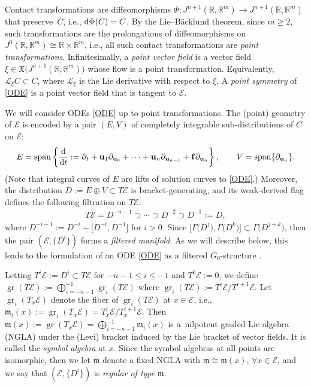 \documentclass[pdftex]{sigma}%
\DeclareMathOperator{\gr}{gr}
\DeclareMathOperator{\sn}{span}
\newcommand\cL{\mathcal{L}}
\renewcommand\gr{\operatorname{gr}}
\newcommand\fm {\mathfrak{m}}
\newcommand{\R}{\mathbb{R}}
\newcommand\cE{\mathcal{E}}
\numberwithin{equation}{section}
\begin{document}
 Contact transformations are diffeomorphisms $\Phi\colon J^{n+1}(\R, \R^m) \to J^{n+1}(\R, \R^m)$ that preserve~$C$, i.e., ${\rm d}\Phi(C) = C$. By the Lie--B\"{a}cklund theorem, since $m \ge 2$, such transformations are the prolongations of diffeomorphisms on $J^0(\R, \R^m) \cong \R \times \R^m$, i.e., all such contact transformations are {\em point transformations}. Infinitesimally, a {\em point vector field} is a vector field $\xi \in \mathfrak{X}\bigl(J^{n+1}(\R,\R^m)\bigr)$ whose flow is a point transformation. Equivalently, $\cL_\xi C \subset C$, where $\cL_\xi$ is the Lie derivative with respect to $\xi$. A {\em point symmetry} of \eqref{ODE} is a point vector field that is tangent to $\cE$.

 We will consider ODEs \eqref{ODE} up to point transformations. The (point) geometry of $\cE$ is encoded by a pair $(E , V)$ of completely integrable sub-distributions of $C$ on $\cE$:
\begin{align} \label{E:EV}
E = \sn \left\{ \frac{\rm d}{{\rm d}t}:=\partial_t + \mathbf{u}_1\partial_{\mathbf{u}_0} + \cdots + \mathbf{u}_{n}\partial_{\mathbf{u}_{n-1}} + \mathbf{f}\partial_{\mathbf{u}_{n}}\right\}, \qquad
V= \sn \{\partial_{\mathbf{u}_n} \}.
\end{align}
(Note that integral curves of $E$ are lifts of solution curves to \eqref{ODE}.) Moreover, the distribution $D := E \oplus V \subset T\mathcal{E}$ is bracket-generating, and its weak-derived flag defines the following filtration on $T\cE$:
 \begin{align*}%
 T\mathcal{E} = D^{-n-1} \supset \cdots \supset D^{-2} \supset D^{-1} := D,
 \end{align*}
 where $D^{-i-1} := D^{-i} + \big[D^{-i}, D^{-1}\big]$
for $i > 0$. Since $\big[\Gamma\bigl(D^j\bigr), \Gamma\bigl(D^k\bigr)\big] \subset \Gamma\bigl(D^{j+k}\bigr)$, then the pair $(\mathcal{E}, \{D^i\})$ forms a {\em filtered manifold}.
As we will describe below, this leads to the formulation of an ODE \eqref{ODE} as a filtered $G_0$-structure \cite[Section~2.1]{Andreas2017}.

Letting $T^i\cE := D^i \subset T\cE$ for $-n-1 \le i \le -1$ and $T^0\cE := 0$, we define
$\gr(T \mathcal{E}) := \bigoplus^{-1}_{i=-n-1} \gr_i(T\mathcal{E})$ where $\gr_i(T\mathcal{E}) := T^i\cE / T^{i+1}\cE$. Let $\gr_i(T_x\cE)$ denote the fiber of $\gr_i(T\cE)$ at $x \in \cE$, i.e., $\fm_i(x):=\gr_i(T_x\cE)= T^i_x\cE / T^{i+1}_x\cE$. Then $\fm (x):=\gr(T_x \cE )= \bigoplus^{-1}_{i=-n-1}\fm_i(x)$ is a~nilpotent graded Lie algebra (NGLA) under the (Levi) bracket induced by the Lie bracket of vector fields. It is called the {\em symbol algebra} at $x$. Since the symbol algebras at all points are isomorphic, then we let $\fm$ denote a fixed NGLA with $\mathfrak{m} \cong \fm (x)$, $\forall x \in \cE$, and we say that $(\cE, \{D^i\})$ is {\em regular of type} $\fm$.
\end{document}
